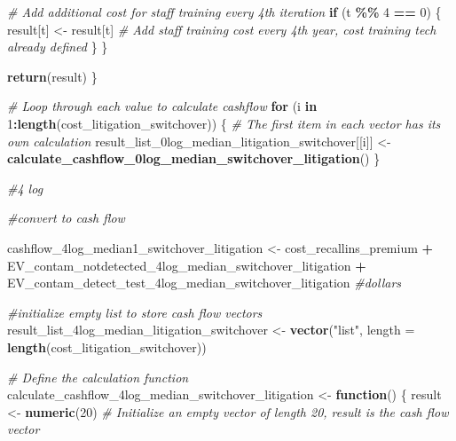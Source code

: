 \documentclass[
]{article}
\newenvironment{Shaded}{\begin{snugshade}}{\end{snugshade}}
\newcommand{\AttributeTok}[1]{\textcolor[rgb]{0.13,0.29,0.53}{#1}}
\newcommand{\CommentTok}[1]{\textcolor[rgb]{0.56,0.35,0.01}{\textit{#1}}}
\newcommand{\ControlFlowTok}[1]{\textcolor[rgb]{0.13,0.29,0.53}{\textbf{#1}}}
\newcommand{\DecValTok}[1]{\textcolor[rgb]{0.00,0.00,0.81}{#1}}
\newcommand{\FunctionTok}[1]{\textcolor[rgb]{0.13,0.29,0.53}{\textbf{#1}}}
\newcommand{\NormalTok}[1]{#1}
\newcommand{\OtherTok}[1]{\textcolor[rgb]{0.56,0.35,0.01}{#1}}
\newcommand{\SpecialCharTok}[1]{\textcolor[rgb]{0.81,0.36,0.00}{\textbf{#1}}}
\newcommand{\StringTok}[1]{\textcolor[rgb]{0.31,0.60,0.02}{#1}}
\begin{document}
\begin{Shaded}
\begin{Highlighting}[]
    \CommentTok{\# Add additional cost for staff training every 4th iteration}
    \ControlFlowTok{if}\NormalTok{ (t }\SpecialCharTok{\%\%} \DecValTok{4} \SpecialCharTok{==} \DecValTok{0}\NormalTok{) \{}
\NormalTok{      result[t] }\OtherTok{\textless{}{-}}\NormalTok{ result[t]  }\CommentTok{\# Add staff training cost every 4th year, cost training tech already defined}
\NormalTok{    \}}
\NormalTok{  \}}
  
  \FunctionTok{return}\NormalTok{(result)}
\NormalTok{\}}

\CommentTok{\# Loop through each value to calculate cashflow}
\ControlFlowTok{for}\NormalTok{ (i }\ControlFlowTok{in} \DecValTok{1}\SpecialCharTok{:}\FunctionTok{length}\NormalTok{(cost\_litigation\_switchover)) \{}
  \CommentTok{\# The first item in each vector has its own calculation}
\NormalTok{  result\_list\_0log\_median\_litigation\_switchover[[i]] }\OtherTok{\textless{}{-}} \FunctionTok{calculate\_cashflow\_0log\_median\_switchover\_litigation}\NormalTok{()}
\NormalTok{\}}




\CommentTok{\#4 log}

\CommentTok{\#convert to cash flow}

\NormalTok{cashflow\_4log\_median1\_switchover\_litigation }\OtherTok{\textless{}{-}}\NormalTok{ cost\_recallins\_premium }\SpecialCharTok{+}\NormalTok{ EV\_contam\_notdetected\_4log\_median\_switchover\_litigation }\SpecialCharTok{+}\NormalTok{ EV\_contam\_detect\_test\_4log\_median\_switchover\_litigation }\CommentTok{\#dollars}

\CommentTok{\#initialize empty list to store cash flow vectors}
\NormalTok{result\_list\_4log\_median\_litigation\_switchover }\OtherTok{\textless{}{-}} \FunctionTok{vector}\NormalTok{(}\StringTok{"list"}\NormalTok{, }\AttributeTok{length =} \FunctionTok{length}\NormalTok{(cost\_litigation\_switchover))}


\CommentTok{\# Define the calculation function}
\NormalTok{calculate\_cashflow\_4log\_median\_switchover\_litigation }\OtherTok{\textless{}{-}} \ControlFlowTok{function}\NormalTok{() \{}
\NormalTok{  result }\OtherTok{\textless{}{-}} \FunctionTok{numeric}\NormalTok{(}\DecValTok{20}\NormalTok{)  }\CommentTok{\# Initialize an empty vector of length 20, result is the cash flow vector}
  

\end{Highlighting}
\end{Shaded}
\end{document}
